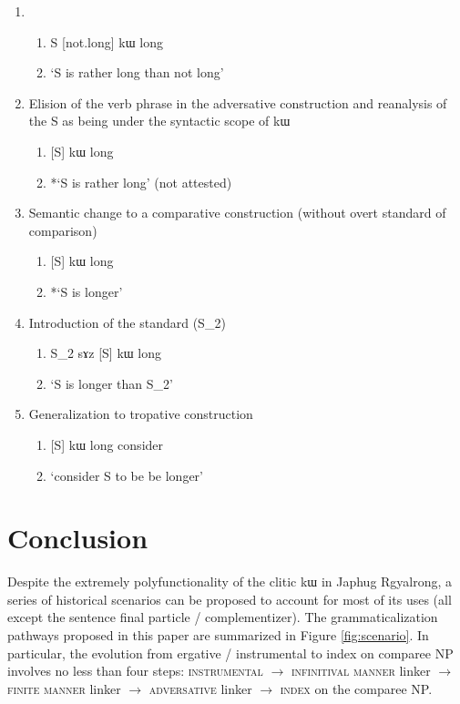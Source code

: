 \documentclass[oldfontcommands,oneside,a4paper,11pt]{article}
\newcommand{\ipa}[1]{{\phon #1}} %
\begin{document}
\begin{enumerate} 
\item 
\begin{enumerate} 
\item S [not.long] \ipa{kɯ} long 
\item `S is rather long than not long'
\end{enumerate} 
\item Elision of the verb phrase in the adversative construction  and reanalysis of the S as being under the syntactic scope of \ipa{kɯ}
\begin{enumerate} 
\item{} [S] \ipa{kɯ} long  
\item *`S is rather long' (not attested)
\end{enumerate} 
\item Semantic change to a comparative construction (without overt standard of comparison)
\begin{enumerate} 
\item{} [S] \ipa{kɯ} long  
\item *`S is longer'  
\end{enumerate} 
\item Introduction of the standard (S_2)
\begin{enumerate} 
\item{} S_2 \ipa{sɤz} [S] \ipa{kɯ} long  
\item  `S is longer than S_2'
\end{enumerate} 
\item Generalization to tropative construction
\begin{enumerate} 
\item{}  [S] \ipa{kɯ} long  consider  
\item  `consider S to be be longer'
\end{enumerate} 
 
\end{enumerate}
  
 


  \section{Conclusion}
Despite the extremely polyfunctionality of the    clitic \ipa{kɯ} in Japhug Rgyalrong, a series of historical scenarios can be proposed to account for most of its uses (all except the sentence final particle / complementizer). The grammaticalization pathways  proposed in this paper are summarized in Figure \ref{fig:scenario}. In particular, the evolution from ergative / instrumental to index on comparee NP involves no less than four steps: \textsc{instrumental} $\rightarrow$ \textsc{infinitival manner} linker $\rightarrow$  \textsc{finite manner} linker $\rightarrow$  \textsc{adversative} linker $\rightarrow$  \textsc{index} on the comparee NP.
\end{document}

